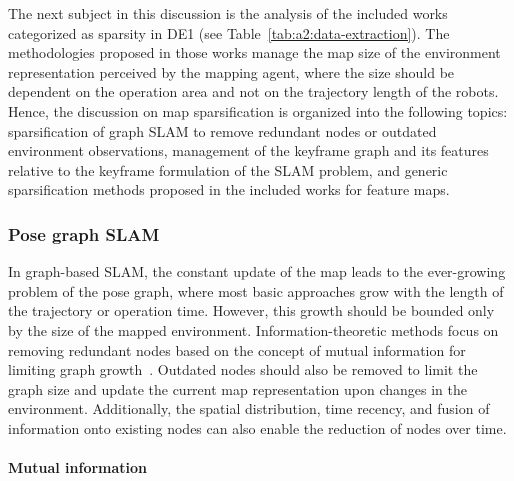 The next subject in this discussion is the analysis of the included works categorized as sparsity in DE1 (see Table~\ref{tab:a2:data-extraction}). The methodologies proposed in those works manage the map size of the environment representation perceived by the mapping agent, where the size should be dependent on the operation area and not on the trajectory length of the robots.
Hence, the discussion on map sparsification is organized into the following topics: sparsification of graph SLAM to remove redundant nodes or outdated environment observations, management of the keyframe graph and its features relative to the keyframe formulation of the SLAM problem, and generic sparsification methods proposed in the included works for feature maps.



\subsubsection{Pose graph SLAM}

In graph-based SLAM, the constant update of the map leads to the ever-growing problem of the pose graph, where most basic approaches grow with the length of the trajectory or operation time. However, this growth should be bounded only by the size of the mapped environment. Information-theoretic methods focus on removing redundant nodes based on the concept of mutual information for limiting graph growth~\parencite{kretzschmar-stachniss:2012:0278364912455072}. Outdated nodes should also be removed to limit the graph size and update the current map representation upon changes in the environment. Additionally, the spatial distribution, time recency, and fusion of information onto existing nodes can also enable the reduction of nodes over time.


\paragraph{Mutual information}

